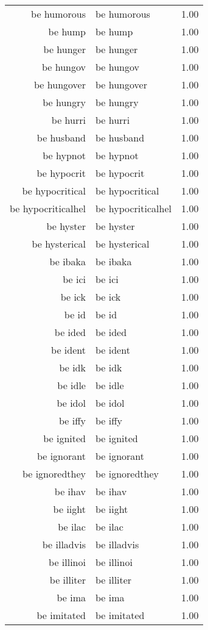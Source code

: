 \begin{table}[ht]
\begin{tabular}{rlr}
  be humorous & be humorous & 1.00 \\ 
  be hump & be hump & 1.00 \\ 
  be hunger & be hunger & 1.00 \\ 
  be hungov & be hungov & 1.00 \\ 
  be hungover & be hungover & 1.00 \\ 
  be hungry & be hungry & 1.00 \\ 
  be hurri & be hurri & 1.00 \\ 
  be husband & be husband & 1.00 \\ 
  be hypnot & be hypnot & 1.00 \\ 
  be hypocrit & be hypocrit & 1.00 \\ 
  be hypocritical & be hypocritical & 1.00 \\ 
  be hypocriticalhel & be hypocriticalhel & 1.00 \\ 
  be hyster & be hyster & 1.00 \\ 
  be hysterical & be hysterical & 1.00 \\ 
  be ibaka & be ibaka & 1.00 \\ 
  be ici & be ici & 1.00 \\ 
  be ick & be ick & 1.00 \\ 
  be id & be id & 1.00 \\ 
  be ided & be ided & 1.00 \\ 
  be ident & be ident & 1.00 \\ 
  be idk & be idk & 1.00 \\ 
  be idle & be idle & 1.00 \\ 
  be idol & be idol & 1.00 \\ 
  be iffy & be iffy & 1.00 \\ 
  be ignited & be ignited & 1.00 \\ 
  be ignorant & be ignorant & 1.00 \\ 
  be ignoredthey & be ignoredthey & 1.00 \\ 
  be ihav & be ihav & 1.00 \\ 
  be iight & be iight & 1.00 \\ 
  be ilac & be ilac & 1.00 \\ 
  be illadvis & be illadvis & 1.00 \\ 
  be illinoi & be illinoi & 1.00 \\ 
  be illiter & be illiter & 1.00 \\ 
  be ima & be ima & 1.00 \\ 
  be imitated & be imitated & 1.00 \\ 

\end{tabular}
\end{table}
